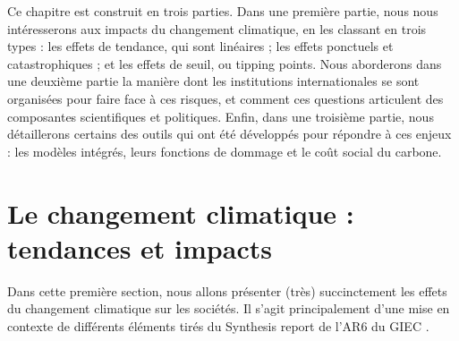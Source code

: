 Ce chapitre est construit en trois parties. Dans une première partie, nous nous intéresserons aux impacts du changement climatique, en les classant en trois types : les effets de tendance, qui sont linéaires ; les effets ponctuels et catastrophiques ; et les effets de seuil, ou tipping points. Nous aborderons dans une deuxième partie la manière dont les institutions internationales se sont organisées pour faire face à ces risques, et comment ces questions articulent des composantes scientifiques et politiques. Enfin, dans une troisième partie, nous détaillerons certains des outils qui ont été développés pour répondre à ces enjeux : les modèles intégrés, leurs fonctions de dommage et le coût social du carbone. 




\section{Le changement climatique : tendances et impacts}
\label{sect/1/1}

Dans cette première section, nous allons présenter (très) succinctement les effets du changement climatique sur les sociétés. Il s'agit principalement d'une mise en contexte de différents éléments tirés du Synthesis report de l'AR6 du GIEC \cite{lee_ipcc_2023}. \\

